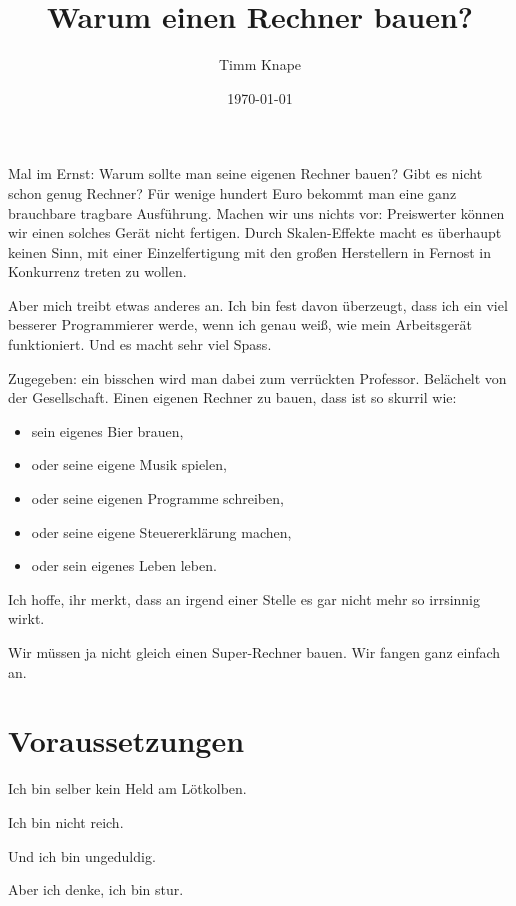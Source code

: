 \documentclass[a5paper,ngerman]{article}
\title{\color{emph}Warum einen Rechner bauen?}
\author{Timm Knape}
\date{\today}
\begin{document}
\pagecolor{background}
\color{normal}
\allsectionsfont{\color{emph}\mdseries}
\pagestyle{plain}
\maketitle
\thispagestyle{fancy}

Mal im Ernst:
Warum sollte man seine eigenen Rechner bauen?
Gibt es nicht schon genug Rechner?
Für wenige hundert Euro bekommt man eine ganz brauchbare tragbare
Ausführung.
Machen wir uns nichts vor:
Preiswerter können wir einen solches Gerät nicht fertigen.
Durch Skalen-Effekte macht es überhaupt keinen Sinn,
mit einer Einzelfertigung mit den großen Herstellern in Fernost
in Konkurrenz treten zu wollen.

Aber mich treibt etwas anderes an.
Ich bin fest davon überzeugt,
dass ich ein viel besserer Programmierer werde,
wenn ich genau weiß, wie mein Arbeitsgerät funktioniert.
Und es macht sehr viel Spass.

Zugegeben: ein bisschen wird man dabei zum verrückten Professor.
Belächelt von der Gesellschaft.
Einen eigenen Rechner zu bauen, dass ist so skurril wie:

\begin{itemize}
\item sein eigenes Bier brauen,
\item oder seine eigene Musik spielen,
\item oder seine eigenen Programme schreiben,
\item oder seine eigene Steuererklärung machen,
\item oder sein eigenes Leben leben.
\end{itemize}

Ich hoffe, ihr merkt, dass an irgend einer Stelle es gar nicht mehr so
irrsinnig wirkt.

Wir müssen ja nicht gleich einen Super-Rechner bauen.
Wir fangen ganz einfach an.

\section{Voraussetzungen}

Ich bin selber kein Held am Lötkolben.

Ich bin nicht reich.

Und ich bin ungeduldig.

Aber ich denke, ich bin stur.
\end{document}
